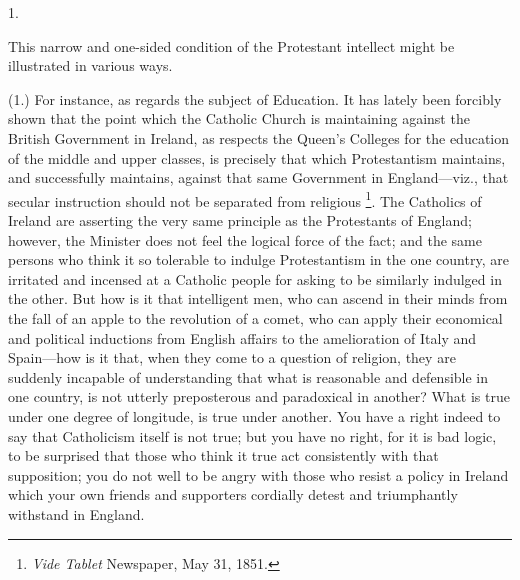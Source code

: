 1.

This narrow and one-sided condition of the Protestant
intellect might be illustrated in various ways.

(1.) For instance, as regards the subject of
Education. It has lately been forcibly shown that the
point which the Catholic Church is maintaining against
the British Government in Ireland, as respects the
Queen's Colleges for the education of the middle and
upper classes, is precisely that which Protestantism
maintains, and successfully maintains, against that same
Government in England—viz., that secular instruction
should not be separated from religious \footnote{\emph{Vide Tablet} Newspaper,
May 31, 1851.}. The
Catholics of Ireland are asserting the very same
principle as the Protestants of England; however, the
Minister does not feel the logical force of the fact; and
the same persons who think it so tolerable to indulge
Protestantism in the one country, are irritated and
incensed at a Catholic people for asking to be similarly
indulged in the other. But how is it that intelligent
men, who can ascend in their minds from the fall of an
apple to the revolution of a comet, who can apply their
economical and political inductions from English affairs
to the amelioration of Italy and Spain—how is it
that, when they come to a question of religion, they are
suddenly incapable of understanding that what is
reasonable and defensible in one country, is not utterly
preposterous and paradoxical in another? What is true
under one degree of longitude, is true under another. You
have a right indeed to say that Catholicism itself is not
true; but you have no right, for it is bad logic, to be
surprised that those who think it true act consistently
with that supposition; you do not well to be angry with
those who resist a policy in Ireland which your own
friends and supporters cordially detest and triumphantly
withstand in England.

